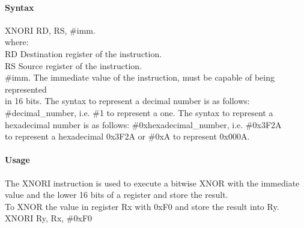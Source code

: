 \documentclass[12pt]{article}
\begin{document}
    \paragraph{Syntax}
    \begin{flushleft}
    XNORI RD, RS, \#imm.\\
    \vspace{1em}        %
    where:\\
    \vspace{1em}
    RD  \hspace{3.6em} Destination register of the instruction.\\
    \vspace{1em}
    RS  \hspace{3.85em} Source register of the instruction.\\
    \vspace{1em}
    \#imm.  \hspace{1.8em} The immediate value of the instruction, must be capable of being represented\\             \hspace{5.4em} in 16 bits. The syntax to represent a decimal number is as follows:\\
            \hspace{5.4em} \#decimal\_number, i.e. \#1 to represent a one. The syntax to represent a\\
            \hspace{5.4em} hexadecimal number is as follows: \#0xhexadecimal\_number, i.e. \#0x3F2A \\
            \hspace{5.4em} to represent a hexadecimal 0x3F2A or \#0xA to represent 0x000A.\\
    \end{flushleft}
    
    \paragraph{Usage}
    \begin{flushleft}
    The XNORI instruction is used to execute a bitwise XNOR with the immediate value and the lower 16 bits of a register and store the result.\\    
    \vspace{1em}
    To XNOR the value in register Rx with 0xF0 and store the result into Ry.\\
    \vspace{1em}
    XNORI Ry, Rx, \#0xF0
    \end{flushleft}
    
\end{document}
